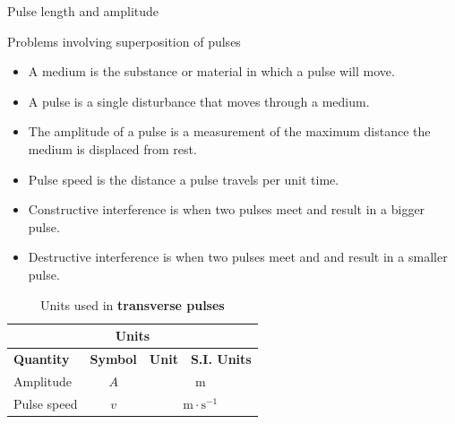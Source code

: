 \begin{Investigation}{Pulse length and amplitude }
\begin{exercises}{ Problems involving superposition of pulses }
\end{exercises}
            \nopagebreak
            \label{m38802*eip-404}\begin{itemize}[noitemsep]
            \item A medium is the substance or material in which a pulse will move.
	    \item A pulse is a single disturbance that moves through a medium.
	    \item The amplitude of a pulse is a measurement of the maximum distance the medium is displaced from rest.
	    \item Pulse speed is the distance a pulse travels per unit time.
	    \item Constructive interference is when two pulses meet and result in a bigger pulse.
	    \item Destructive interference is when two pulses meet and and result in a smaller pulse.
	    \end{itemize}
        \label{m38802*cid9}
\begin{table}[H]
\begin{center}
\begin{tabular}{|l|c|c|c|}\hline \hline 
\multicolumn{4}{|c|}{\textbf{Units}}\\ \hline \hline
\textbf{Quantity} & \textbf{Symbol} & \textbf{Unit} & \textbf{S.I. Units}  \\ \hline
Amplitude & $A$ & \multicolumn{2}{c|}{m} \\ \hline
Pulse speed & $v$ & \multicolumn{2}{c|}{$\text{m} \cdot \text{s}^{-1}$} \\ \hline
\end{tabular}
\end{center}
\caption{Units used in \textbf{transverse pulses} }
\label{table:electricity::units}
\end{table}


\end{Investigation}
